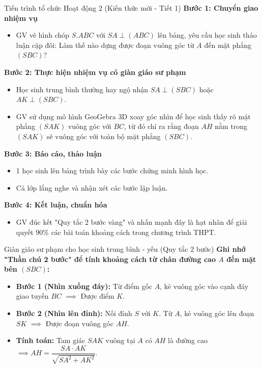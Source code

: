 \documentclass[12pt, a4paper]{article}
\begin{document}
\begin{pedabox}{Tiến trình tổ chức Hoạt động 2 (Kiến thức mới - Tiết 1)}
    \textbf{Bước 1: Chuyển giao nhiệm vụ}
    \begin{itemize}[leftmargin=0.6cm]
        \item GV vẽ hình chóp $S.ABC$ với $SA \perp (ABC)$ lên bảng, yêu cầu học sinh thảo luận cặp đôi: Làm thế nào dựng được đoạn vuông góc từ $A$ đến mặt phẳng $(SBC)$?
    \end{itemize}

    \textbf{Bước 2: Thực hiện nhiệm vụ có giàn giáo sư phạm}
    \begin{itemize}[leftmargin=0.6cm]
        \item Học sinh trung bình thường hay ngộ nhận $SA \perp (SBC)$ hoặc $AK \perp (SBC)$.
        \item GV sử dụng mô hình GeoGebra 3D xoay góc nhìn để học sinh thấy rõ mặt phẳng $(SAK)$ vuông góc với $BC$, từ đó chỉ ra rằng đoạn $AH$ nằm trong $(SAK)$ sẽ vuông góc với toàn bộ mặt phẳng $(SBC)$.
    \end{itemize}

    \textbf{Bước 3: Báo cáo, thảo luận}
    \begin{itemize}[leftmargin=0.6cm]
        \item 1 học sinh lên bảng trình bày các bước chứng minh hình học.
        \item Cả lớp lắng nghe và nhận xét các bước lập luận.
    \end{itemize}

    \textbf{Bước 4: Kết luận, chuẩn hóa}
    \begin{itemize}[leftmargin=0.6cm]
        \item GV đúc kết "Quy tắc 2 bước vàng" và nhấn mạnh đây là hạt nhân để giải quyết $90\%$ các bài toán khoảng cách trong chương trình THPT.
    \end{itemize}
\end{pedabox}

\begin{scaffoldbox}{Giàn giáo sư phạm cho học sinh trung bình - yếu (Quy tắc 2 bước)}
    \textbf{Ghi nhớ "Thần chú 2 bước" để tính khoảng cách từ chân đường cao $A$ đến mặt bên $(SBC)$:}
    \begin{itemize}[leftmargin=0.6cm]
        \item \textbf{Bước 1 (Nhìn xuống đáy):} Từ điểm gốc $A$, kẻ vuông góc vào cạnh đáy giao tuyến $BC$ $\implies$ Được điểm $K$.
        \item \textbf{Bước 2 (Nhìn lên đỉnh):} Nối đỉnh $S$ với $K$. Từ $A$, kẻ vuông góc lên đoạn $SK$ $\implies$ Được đoạn vuông góc $AH$.
        \item \textbf{Tính toán:} Tam giác $SAK$ vuông tại $A$ có $AH$ là đường cao $\implies AH = \dfrac{SA \cdot AK}{\sqrt{SA^2 + AK^2}}$.
    \end{itemize}
\end{scaffoldbox}
\end{document}
